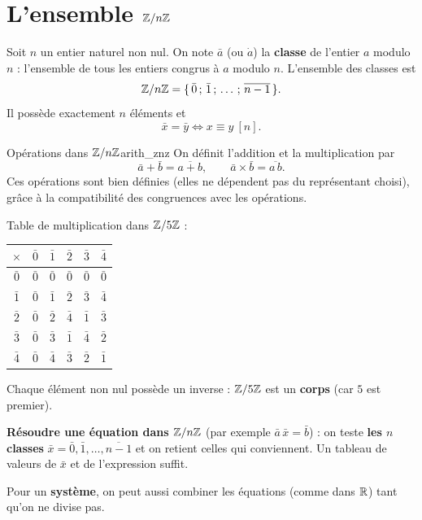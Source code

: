 \section{L'ensemble $\mathbb{Z}/n\mathbb{Z}$}

\begin{definition}
	Soit $n$ un entier naturel non nul. On note $\bar a$ (ou $\dot a$) la
	\textbf{classe} de l'entier $a$ modulo $n$ : l'ensemble de tous les entiers
	congrus à $a$ modulo $n$. L'ensemble des classes est
	$$
	\mathbb{Z}/n\mathbb{Z} = \{\,\bar 0\,;\,\bar 1\,;\,\ldots\,;\,\overline{n-1}\,\}.
	$$
	Il possède exactement $n$ éléments et
	$$
	\bar x = \bar y \iff x \equiv y\ [n].
	$$
\end{definition}

\begin{propriete}{Opérations dans $\mathbb{Z}/n\mathbb{Z}$}{arith_znz}
	On définit l'addition et la multiplication par
	$$
	\bar a + \bar b = \overline{a + b},
	\qquad
	\bar a \times \bar b = \overline{a\,b}.
	$$
	Ces opérations sont bien définies (elles ne dépendent pas du représentant
	choisi), grâce à la compatibilité des congruences avec les opérations.
\end{propriete}

\begin{exemple}
	Table de multiplication dans $\mathbb{Z}/5\mathbb{Z}$ :
	\begin{center}
	\renewcommand{\arraystretch}{1.15}
	\begin{tabular}{c|ccccc}
	$\times$ & $\bar0$ & $\bar1$ & $\bar2$ & $\bar3$ & $\bar4$ \\
	\hline
	$\bar0$ & $\bar0$ & $\bar0$ & $\bar0$ & $\bar0$ & $\bar0$ \\
	$\bar1$ & $\bar0$ & $\bar1$ & $\bar2$ & $\bar3$ & $\bar4$ \\
	$\bar2$ & $\bar0$ & $\bar2$ & $\bar4$ & $\bar1$ & $\bar3$ \\
	$\bar3$ & $\bar0$ & $\bar3$ & $\bar1$ & $\bar4$ & $\bar2$ \\
	$\bar4$ & $\bar0$ & $\bar4$ & $\bar3$ & $\bar2$ & $\bar1$ \\
	\end{tabular}
	\end{center}
	Chaque élément non nul possède un inverse : $\mathbb{Z}/5\mathbb{Z}$ est un \textbf{corps}
	(car $5$ est premier).
\end{exemple}

\begin{methode}
	\textbf{Résoudre une équation dans $\mathbb{Z}/n\mathbb{Z}$} (par exemple $\bar a\,\bar x = \bar b$) :
	on teste \textbf{les $n$ classes} $\bar x = \bar 0,\bar 1,\ldots,\overline{n-1}$
	et on retient celles qui conviennent. Un tableau de valeurs de $\bar x$ et de
	l'expression suffit.

	Pour un \textbf{système}, on peut aussi combiner les équations (comme dans
	$\mathbb{R}$) tant qu'on ne divise pas.
\end{methode}

